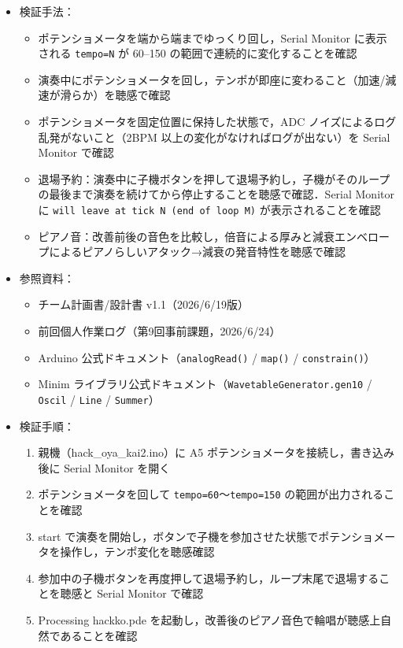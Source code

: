 \documentclass[a4paper,11pt]{ltjsarticle}
\providecommand{\％}{\%}
\begin{document}
\begin{itemize}
    \item 検証手法：
    \begin{itemize}
        \item ポテンショメータを端から端までゆっくり回し，Serial Monitor に表示される \texttt{tempo=N} が 60--150 の範囲で連続的に変化することを確認
        \item 演奏中にポテンショメータを回し，テンポが即座に変わること（加速/減速が滑らか）を聴感で確認
        \item ポテンショメータを固定位置に保持した状態で，ADC ノイズによるログ乱発がないこと（2BPM 以上の変化がなければログが出ない）を Serial Monitor で確認
        \item 退場予約：演奏中に子機ボタンを押して退場予約し，子機がそのループの最後まで演奏を続けてから停止することを聴感で確認．Serial Monitor に \texttt{will leave at tick N (end of loop M)} が表示されることを確認
        \item ピアノ音：改善前後の音色を比較し，倍音による厚みと減衰エンベロープによるピアノらしいアタック→減衰の発音特性を聴感で確認
    \end{itemize}
    \item 参照資料：
    \begin{itemize}
        \item チーム計画書/設計書 v1.1（2026/6/19版）
        \item 前回個人作業ログ（第9回事前課題，2026/6/24）
        \item Arduino 公式ドキュメント（\texttt{analogRead()} / \texttt{map()} / \texttt{constrain()}）
        \item Minim ライブラリ公式ドキュメント（\texttt{WavetableGenerator.gen10} / \texttt{Oscil} / \texttt{Line} / \texttt{Summer}）
    \end{itemize}
    \item 検証手順：
    \begin{enumerate}
        \item 親機（hack\_oya\_kai2.ino）に A5 ポテンショメータを接続し，書き込み後に Serial Monitor を開く
        \item ポテンショメータを回して \texttt{tempo=60}〜\texttt{tempo=150} の範囲が出力されることを確認
        \item start で演奏を開始し，ボタンで子機を参加させた状態でポテンショメータを操作し，テンポ変化を聴感確認
        \item 参加中の子機ボタンを再度押して退場予約し，ループ末尾で退場することを聴感と Serial Monitor で確認
        \item Processing hackko.pde を起動し，改善後のピアノ音色で輪唱が聴感上自然であることを確認
    \end{enumerate}
\end{itemize}
\end{document}
